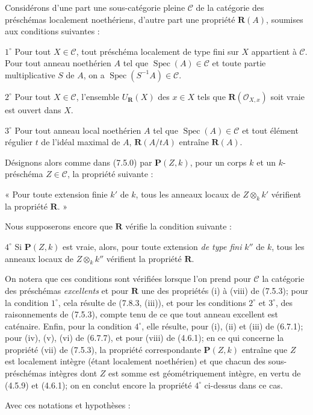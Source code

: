 \begin{env}[7.9.7]
\label{IV.2.s7.9.7-fr}
Considérons d'une part une sous-catégorie pleine $\mathcal C$ de la catégorie
des préschémas localement noethériens, d'autre part une propriété
$\boldsymbol R(A)$, soumises aux conditions suivantes :

$1^\circ$ Pour tout $X\in\mathcal C$, tout préschéma localement de type fini
sur $X$ appartient à $\mathcal C$. Pour tout anneau noethérien $A$ tel que
$\operatorname{Spec}(A)\in\mathcal C$ et toute partie multiplicative $S$ de
$A$, on a $\operatorname{Spec}(S^{-1}A)\in\mathcal C$.

$2^\circ$ Pour tout $X\in\mathcal C$, l'ensemble
$U_{\boldsymbol R}(X)$ des $x\in X$ tels que
$\boldsymbol R(\mathcal O_{X,x})$ soit vraie est ouvert dans $X$.

$3^\circ$ Pour tout anneau local noethérien $A$ tel que
$\operatorname{Spec}(A)\in\mathcal C$ et tout élément régulier $t$ de l'idéal
maximal de $A$, $\boldsymbol R(A/tA)$ entraîne $\boldsymbol R(A)$.

Désignons alors comme dans (7.5.0) par $\boldsymbol P(Z,k)$, pour un corps $k$
et un $k$-préschéma $Z\in\mathcal C$, la propriété suivante :

« Pour toute extension finie $k'$ de $k$, tous les anneaux locaux de
$Z\otimes_k k'$ vérifient la propriété $\boldsymbol R$. »


Nous supposerons encore que $\boldsymbol R$ vérifie la condition suivante :

$4^\circ$ Si $\boldsymbol P(Z,k)$ est vraie, alors, pour toute extension
\emph{de type fini} $k''$ de $k$, tous les anneaux locaux de
$Z\otimes_k k''$ vérifient la propriété $\boldsymbol R$.

On notera que ces conditions sont vérifiées lorsque l'on prend pour
$\mathcal C$ la catégorie des préschémas \emph{excellents} et pour
$\boldsymbol R$ une des propriétés (i) à (viii) de (7.5.3); pour la condition
$1^\circ$, cela résulte de (7.8.3, (iii)), et pour les conditions $2^\circ$ et
$3^\circ$, des raisonnements de (7.5.3), compte tenu de ce que tout anneau
excellent est caténaire. Enfin, pour la condition $4^\circ$, elle résulte,
pour (i), (ii) et (iii) de (6.7.1); pour (iv), (v), (vi) de (6.7.7), et pour
(viii) de (4.6.1); en ce qui concerne la propriété (vii) de (7.5.3), la
propriété correspondante $\boldsymbol P(Z,k)$ entraîne que $Z$ est localement
intègre (étant localement noethérien) et que chacun des sous-préschémas
intègres dont $Z$ est somme est géométriquement intègre, en vertu de (4.5.9)
et (4.6.1); on en conclut encore la propriété $4^\circ$ ci-dessus dans ce cas.

Avec ces notations et hypothèses :
\end{env}

